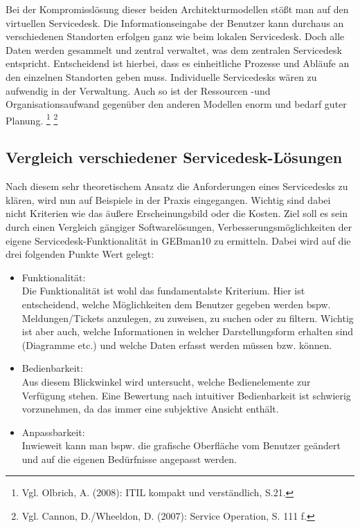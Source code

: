\noindent
Bei der Kompromisslösung dieser beiden Architekturmodellen stößt man auf den virtuellen Servicedesk. Die Informationseingabe der Benutzer kann durchaus an verschiedenen Standorten erfolgen ganz wie beim lokalen Servicedesk. Doch alle Daten werden gesammelt und zentral verwaltet, was dem zentralen Servicedesk entspricht. Entscheidend ist hierbei, dass es einheitliche Prozesse und Abläufe an den einzelnen Standorten geben muss. Individuelle Servicedesks wären zu aufwendig in der Verwaltung. Auch so ist der Ressourcen -und Organisationsaufwand gegenüber den anderen Modellen enorm und bedarf guter Planung. \footnote{Vgl. Olbrich, A. (2008): ITIL kompakt und verständlich, S.21.} \footnote{Vgl. Cannon, D./Wheeldon, D. (2007): Service Operation, S. 111 f.} \\


\subsection{Vergleich verschiedener Servicedesk-Lösungen}

\noindent
Nach diesem sehr theoretischem Ansatz die Anforderungen eines Servicedesks zu klären, wird nun auf Beispiele in der Praxis eingegangen. Wichtig sind dabei nicht Kriterien wie das äußere Erscheinungsbild oder die Kosten. Ziel soll es sein durch einen Vergleich gängiger Softwarelösungen, Verbesserungsmöglichkeiten der eigene Servicedesk-Funktionalität in GEBman10 zu ermitteln. Dabei wird auf die drei folgenden Punkte Wert gelegt:

\begin{itemize}
\item Funktionalität:\\
		Die Funktionalität ist wohl das fundamentalste Kriterium. Hier ist entscheidend, welche 			
		Möglichkeiten dem Benutzer gegeben werden bspw. Meldungen/Tickets anzulegen, zu 
		zuweisen, zu suchen oder zu filtern. Wichtig ist aber auch, welche Informationen in welcher 
		Darstellungsform erhalten sind (Diagramme etc.) und welche Daten erfasst werden müssen 
		bzw. können.\\
		 
\item Bedienbarkeit:\\
		Aus diesem Blickwinkel wird untersucht, welche Bedienelemente zur Verfügung stehen. Eine	
		Bewertung nach intuitiver Bedienbarkeit ist schwierig vorzunehmen, da das immer eine
		subjektive Ansicht enthält.\\
		
\item Anpassbarkeit:\\
		Inwieweit kann man bspw. die grafische Oberfläche vom Benutzer geändert und auf die 
		eigenen Bedürfnisse angepasst werden.\\		
\end{itemize}


